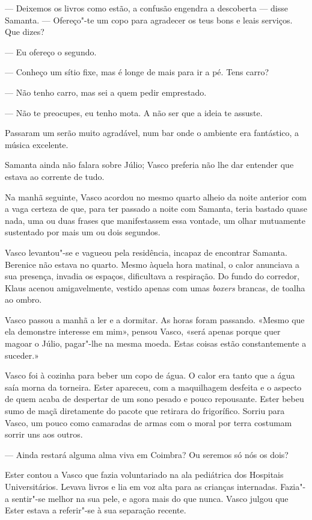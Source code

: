 --- Deixemos os livros como estão, a confusão engendra a descoberta ---
  disse Samanta. --- Ofereço"-te um copo para agradecer os teus bons e
  leais serviços. Que dizes?


--- Eu ofereço o segundo.

--- Conheço um sítio fixe, mas é longe de mais para ir a pé. Tens carro?

--- Não tenho carro, mas sei a quem pedir emprestado.

--- Não te preocupes, eu tenho mota. A não ser que a ideia te assuste.


Passaram um serão muito agradável, num bar onde o ambiente era
fantástico, a música excelente.

Samanta ainda não falara sobre Júlio; Vasco preferia não lhe dar
entender que estava ao corrente de tudo.

Na manhã seguinte, Vasco acordou no mesmo quarto alheio da noite
anterior com a vaga certeza de que, para ter passado a noite com
Samanta, teria bastado quase nada, uma ou duas frases que manifestassem
essa vontade, um olhar mutuamente sustentado por mais um ou dois
segundos.

Vasco levantou"-se e vagueou pela residência, incapaz de encontrar
Samanta. Berenice não estava no quarto. Mesmo àquela hora matinal, o
calor anunciava a sua presença, invadia os espaços, dificultava a
respiração. Do fundo do corredor, Klaus acenou amigavelmente, vestido
apenas com umas \emph{boxers }brancas, de toalha ao ombro.

Vasco passou a manhã a ler e a dormitar. As horas foram passando. «Mesmo
que ela demonstre interesse em mim», pensou Vasco, «será apenas porque
quer magoar o Júlio, pagar"-lhe na mesma moeda. Estas coisas estão
constantemente a suceder.»

Vasco foi à cozinha para beber um copo de água. O calor era tanto que a
água saía morna da torneira. Ester apareceu, com a maquilhagem desfeita
e o aspecto de quem acaba de despertar de um sono pesado e pouco
repousante. Ester bebeu sumo de maçã diretamente do pacote que retirara
do frigorífico. Sorriu para Vasco, um pouco como camaradas de armas com o moral
por terra costumam sorrir uns aos outros.

--- Ainda restará alguma alma viva em Coimbra? Ou seremos só nós os
  dois?


Ester contou a Vasco que fazia voluntariado na ala pediátrica dos
Hospitais Universitários. Levava livros e lia em voz alta para as
crianças internadas. Fazia"-a sentir"-se melhor na sua pele, e agora mais
do que nunca. Vasco julgou que Ester estava a referir"-se à sua separação
recente.

